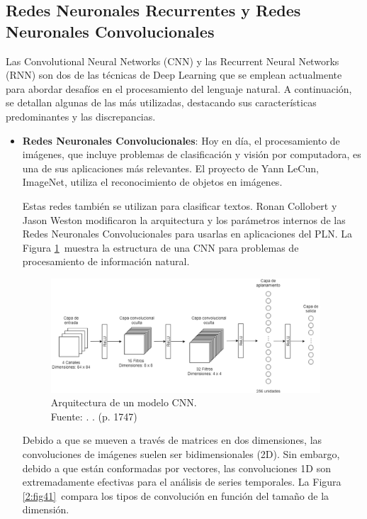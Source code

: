 \subsection{Redes Neuronales Recurrentes y Redes Neuronales Convolucionales}

Las Convolutional Neural Networks (CNN) y las Recurrent Neural Networks (RNN) son dos de las técnicas de Deep Learning que se emplean actualmente para abordar desafíos en el procesamiento del lenguaje natural. A continuación, se detallan algunas de las más utilizadas, destacando sus características predominantes y las discrepancias.

\begin{itemize}
	\item \textbf{Redes Neuronales Convolucionales}: Hoy en día, el procesamiento de imágenes, que incluye problemas de clasificación y visión por computadora, es una de sus aplicaciones más relevantes. El proyecto de Yann LeCun, ImageNet, utiliza el reconocimiento de objetos en imágenes.
	
	Estas redes también se utilizan para clasificar textos. Ronan Collobert y Jason Weston modificaron la arquitectura y los parámetros internos de las Redes Neuronales Convolucionales para usarlas en aplicaciones del PLN. La Figura \ref{2:fig40} muestra la estructura de una CNN para problemas de procesamiento de información natural. \parencite{bk_kamath2019deeplearning_nlp_sr}
	\begin{figure}[!ht]
		\begin{center}
			\includegraphics[width=0.95\textwidth]{2/figures/cnn_nlp.png}
			\caption[Arquitectura de un modelo CNN]{Arquitectura de un modelo CNN.\\
			Fuente: \cite{tec_kim2014convolutional}. . (p. 1747)}
			\label{2:fig40}
		\end{center}
	\end{figure}
	
	Debido a que se mueven a través de matrices en dos dimensiones, las convoluciones de imágenes suelen ser bidimensionales (2D). Sin embargo, debido a que están conformadas por vectores, las convoluciones 1D son extremadamente efectivas para el análisis de series temporales. La Figura \ref{2:fig41} compara los tipos de convolución en función del tamaño de la dimensión. \parencite{bk_rao2019nlp_pytorch}


\end{itemize}
